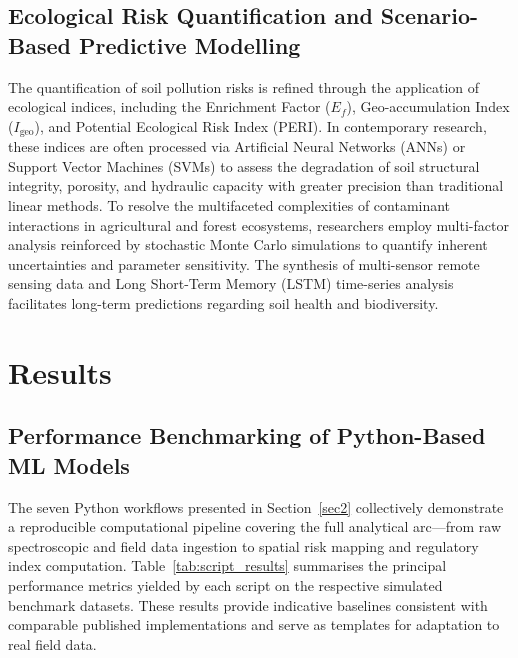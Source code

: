 \documentclass[land,article,submit,pdftex,moreauthors]{Definitions/mdpi}
\begin{document}
\subsection{Ecological Risk Quantification and Scenario-Based Predictive
    Modelling}\label{sec4.2}

The quantification of soil pollution risks is refined through the application
of ecological indices, including the Enrichment Factor ($E_f$),
Geo-accumulation Index ($I_{\text{geo}}$), and Potential Ecological Risk
Index (PERI). In contemporary research, these indices are often processed via
Artificial Neural Networks (ANNs) or Support Vector Machines (SVMs) to assess
the degradation of soil structural integrity, porosity, and hydraulic capacity
with greater precision than traditional linear methods. To resolve the
multifaceted complexities of contaminant interactions in agricultural and
forest ecosystems, researchers employ multi-factor analysis reinforced by
stochastic Monte Carlo simulations to quantify inherent uncertainties and
parameter sensitivity. The synthesis of multi-sensor remote sensing data and
Long Short-Term Memory (LSTM) time-series analysis facilitates long-term
predictions regarding soil health and biodiversity.

\section{Results}\label{sec5}

\subsection{Performance Benchmarking of Python-Based ML Models}\label{sec5.1}

The seven Python workflows presented in Section~\ref{sec2} collectively
demonstrate a reproducible computational pipeline covering the full analytical
arc---from raw spectroscopic and field data ingestion to spatial risk mapping
and regulatory index computation. Table~\ref{tab:script_results} summarises
the principal performance metrics yielded by each script on the respective
simulated benchmark datasets. These results provide indicative baselines
consistent with comparable published implementations and serve as templates
for adaptation to real field data.
\end{document}
